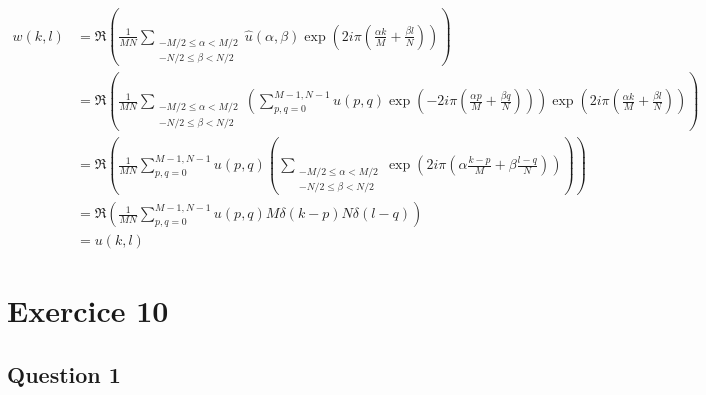 \documentclass[12pt,a4paper,onecolumn]{article}
\begin{document}
\begin{equation}
	\begin{split}
		w(k,l) &= \Re\left(\frac{1}{MN}\sum_{\substack{-M/2 \le \alpha < M/2\\ -N/2 \le \beta < N/2}}  \widehat{u}(\alpha, \beta) \exp\left(2i\pi(\frac{\alpha k}{M} + \frac{\beta l}{N})\right) \right) \\
		&= \Re\left(\frac{1}{MN}\sum_{\substack{-M/2 \le \alpha < M/2\\ -N/2 \le \beta < N/2}}  \left( \sum_{p, q = 0}^{M-1, N-1}u(p, q)\exp\left(-2i\pi(\frac{\alpha p}{M} + \frac{\beta q}{N})\right)\right) \exp\left(2i\pi(\frac{\alpha k}{M} + \frac{\beta l}{N})\right) \right)\\
		&= \Re\left(\frac{1}{MN} \sum_{p, q = 0}^{M-1, N-1}u(p, q) \left( \sum_{\substack{-M/2 \le \alpha < M/2\\ -N/2 \le \beta < N/2}} \exp\left(2i\pi(\alpha \frac{k - p}{M} + \beta\frac{l-q}{N})\right)\right)\right)\\
		&= \Re\left(\frac{1}{MN} \sum_{p, q = 0}^{M-1, N-1}u(p, q) M\delta(k-p)N\delta(l-q)\right)\\
		&= u(k,l)
	\end{split}
\end{equation}

\section{Exercice 10}

\subsection{Question 1}
\end{document}
